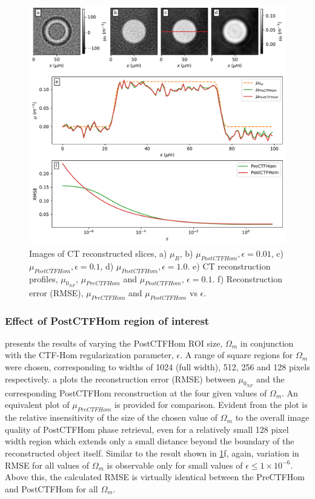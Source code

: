 \documentclass[twocolumn, switch]{article} %
\begin{document}
\begin{figure}[!htbp]
    \centering
        \includegraphics[width=\linewidth]{ctf_paper_results_figure_4.pdf}
        \caption{Images of CT reconstructed slices,  a) $\mu_R$, b) $\mu_{PostCTFHom}, \epsilon=0.01$, c) $\mu_{PostCTFHom}, \epsilon=0.1$, d) $\mu_{PostCTFHom}, \epsilon=1.0$. e) CT reconstruction profiles, $\mu_{0_{NF}}$, $\mu_{PreCTFHom}$ and $\mu_{PostCTFHom}$, $\epsilon=0.1$.  f) Reconstruction error (RMSE),  $\mu_{PreCTFHom}$ and $\mu_{PostCTFHom}$ vs $\epsilon$.}
        \label{fig:combined_PostCTFHom}
\end{figure}

\subsubsection{Effect of PostCTFHom region of interest}\label{s3:ctf_roi}

 presents the results of varying the PostCTFHom ROI size, ${\Omega _m}$ in conjunction with the CTF-Hom regularization parameter, $\epsilon$. A range of square regions for ${\Omega _m}$ were chosen, corresponding to widths of 1024 (full width), 512, 256 and 128 pixels respectively. a plots the reconstruction error (RMSE) between $\mu_{0_{NF}}$ and the corresponding PostCTFHom reconstruction at the four given values of ${\Omega _m}$. An equivalent plot of $\mu_{PreCTFHom}$ is provided for comparison. Evident from the plot is the relative insensitivity of the size of the chosen value of ${\Omega _m}$ to the overall image quality of PostCTFHom phase retrieval, even for a relatively small 128 pixel width region which extends only a small distance beyond the boundary of the reconstructed object itself. Similar to the result shown in \cref{fig:combined_PostCTFHom}f, again, variation in RMSE for all values of ${\Omega _m}$ is observable only for small values of $\epsilon\le1\times 10^{-6}$. Above this, the calculated RMSE is virtually identical between the PreCTFHom and PostCTFHom for all ${\Omega _m}$.
\end{document}
